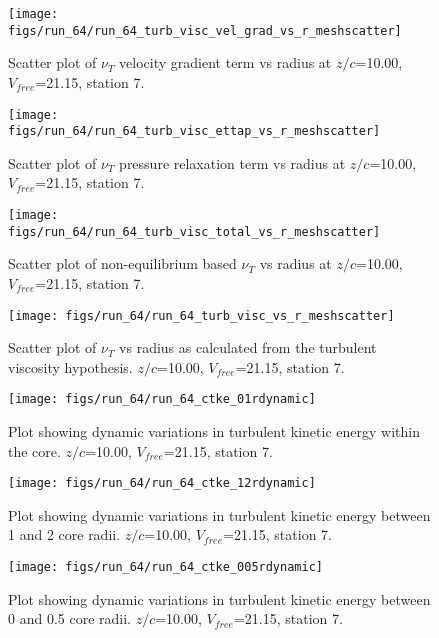\begin{figure}[H]
\centering
\texttt{[image: figs/run\_64/run\_64\_turb\_visc\_vel\_grad\_vs\_r\_meshscatter]}
\caption{Scatter plot of $\nu_T$ velocity gradient term vs radius at $z/c$=10.00, $V_{free}$=21.15, station 7.}
\end{figure}


\begin{figure}[H]
\centering
\texttt{[image: figs/run\_64/run\_64\_turb\_visc\_ettap\_vs\_r\_meshscatter]}
\caption{Scatter plot of $\nu_T$ pressure relaxation term vs radius at $z/c$=10.00, $V_{free}$=21.15, station 7.}
\end{figure}


\begin{figure}[H]
\centering
\texttt{[image: figs/run\_64/run\_64\_turb\_visc\_total\_vs\_r\_meshscatter]}
\caption{Scatter plot of non-equilibrium based $\nu_T$ vs radius at $z/c$=10.00, $V_{free}$=21.15, station 7.}
\end{figure}


\begin{figure}[H]
\centering
\texttt{[image: figs/run\_64/run\_64\_turb\_visc\_vs\_r\_meshscatter]}
\caption{Scatter plot of $\nu_T$ vs radius as calculated from the turbulent viscosity hypothesis. $z/c$=10.00, $V_{free}$=21.15, station 7.}
\end{figure}


\begin{figure}[H]
\centering
\texttt{[image: figs/run\_64/run\_64\_ctke\_01rdynamic]}
\caption{Plot showing dynamic variations in turbulent kinetic energy within the core. $z/c$=10.00, $V_{free}$=21.15, station 7.}
\end{figure}


\begin{figure}[H]
\centering
\texttt{[image: figs/run\_64/run\_64\_ctke\_12rdynamic]}
\caption{Plot showing dynamic variations in turbulent kinetic energy between 1 and 2 core radii. $z/c$=10.00, $V_{free}$=21.15, station 7.}
\end{figure}


\begin{figure}[H]
\centering
\texttt{[image: figs/run\_64/run\_64\_ctke\_005rdynamic]}
\caption{Plot showing dynamic variations in turbulent kinetic energy between 0 and 0.5 core radii. $z/c$=10.00, $V_{free}$=21.15, station 7.}
\end{figure}


